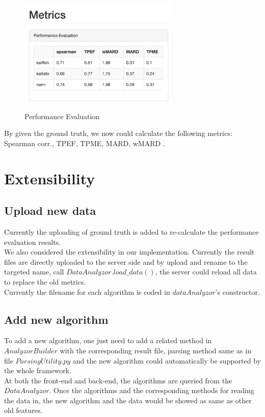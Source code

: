 \documentclass[11pt,letter]{article}
\begin{document}
\begin{figure}[h!]
\centering
\includegraphics[height=2.25in, width=3in]{./fig/metrics.jpg}
\caption{Performance Evaluation}
\label{fig:metrics}
\end{figure}

By given the ground truth, we now could calculate the following metrics: Spearman corr., TPEF, TPME, MARD, wMARD \cite{rapmap}.


\section {Extensibility}
\subsection {Upload new data}
Currently the uploading of ground truth is added to re-calculate the performance evaluation results. \\
We also considered the extensibility in our implementation. Currently the result files are directly uploaded to the server side and by upload and rename to the targeted name, call $DataAnalyzor.load\_data()$, the server could reload all data to replace the old metrics. \\
Currently the filename for each algorithm is coded in $dataAnalyzor$'s constructor.
\subsection {Add new algorithm}
To add a new algorithm, one just need to add a related method in $AnalyzorBuilder$  with the corresponding result file, parsing method same as in file $ParsingUtility.py$ and the new algorithm could automatically be supported by the whole framework. \\
At both the front-end and back-end, the algorithms are queried from the $DataAnalyzor$. Once the algorithms and the corresponding methods for reading the data in, the new algorithm and the data would be showed as same as other old features.
\end{document}
